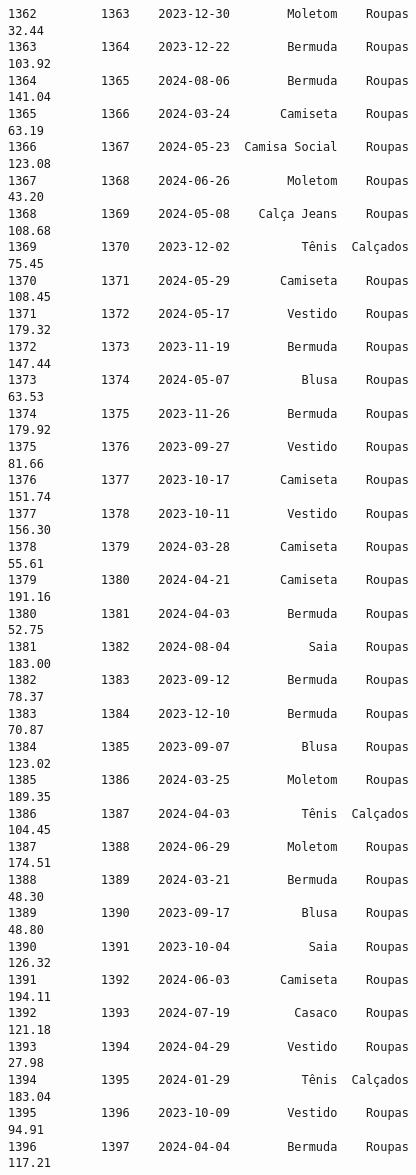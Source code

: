 \documentclass[11pt]{article}
\begin{document}
\begin{Verbatim}[commandchars=\\\{\}]
1362         1363    2023-12-30        Moletom    Roupas           32.44   
1363         1364    2023-12-22        Bermuda    Roupas          103.92   
1364         1365    2024-08-06        Bermuda    Roupas          141.04   
1365         1366    2024-03-24       Camiseta    Roupas           63.19   
1366         1367    2024-05-23  Camisa Social    Roupas          123.08   
1367         1368    2024-06-26        Moletom    Roupas           43.20   
1368         1369    2024-05-08    Calça Jeans    Roupas          108.68   
1369         1370    2023-12-02          Tênis  Calçados           75.45   
1370         1371    2024-05-29       Camiseta    Roupas          108.45   
1371         1372    2024-05-17        Vestido    Roupas          179.32   
1372         1373    2023-11-19        Bermuda    Roupas          147.44   
1373         1374    2024-05-07          Blusa    Roupas           63.53   
1374         1375    2023-11-26        Bermuda    Roupas          179.92   
1375         1376    2023-09-27        Vestido    Roupas           81.66   
1376         1377    2023-10-17       Camiseta    Roupas          151.74   
1377         1378    2023-10-11        Vestido    Roupas          156.30   
1378         1379    2024-03-28       Camiseta    Roupas           55.61   
1379         1380    2024-04-21       Camiseta    Roupas          191.16   
1380         1381    2024-04-03        Bermuda    Roupas           52.75   
1381         1382    2024-08-04           Saia    Roupas          183.00   
1382         1383    2023-09-12        Bermuda    Roupas           78.37   
1383         1384    2023-12-10        Bermuda    Roupas           70.87   
1384         1385    2023-09-07          Blusa    Roupas          123.02   
1385         1386    2024-03-25        Moletom    Roupas          189.35   
1386         1387    2024-04-03          Tênis  Calçados          104.45   
1387         1388    2024-06-29        Moletom    Roupas          174.51   
1388         1389    2024-03-21        Bermuda    Roupas           48.30   
1389         1390    2023-09-17          Blusa    Roupas           48.80   
1390         1391    2023-10-04           Saia    Roupas          126.32   
1391         1392    2024-06-03       Camiseta    Roupas          194.11   
1392         1393    2024-07-19         Casaco    Roupas          121.18   
1393         1394    2024-04-29        Vestido    Roupas           27.98   
1394         1395    2024-01-29          Tênis  Calçados          183.04   
1395         1396    2023-10-09        Vestido    Roupas           94.91   
1396         1397    2024-04-04        Bermuda    Roupas          117.21   

\end{Verbatim}
\end{document}
